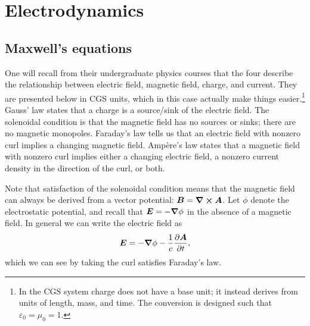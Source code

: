 \section{Electrodynamics}
\subsection{Maxwell's equations}
One will recall from their undergraduate physics courses that the four  describe the relationship between electric field, magnetic field, charge, and current. They are presented below in CGS units, which in this case actually make things easier.\footnote{In the CGS system charge does not have a base unit; it instead derives from units of length, mass, and time. The conversion is designed such that $\varepsilon_0 = \mu_0 = 1$.}
Gauss' law states that a charge is a source/sink of the electric field. The solenoidal condition is that the magnetic field has no sources or sinks; there are no magnetic monopoles. Faraday's law tells us that an electric field with nonzero curl implies a changing magnetic field. Ampère's law states that a magnetic field with nonzero curl implies either a changing electric field, a nonzero current density in the direction of the curl, or both.

Note that satisfaction of the solenoidal condition means that the magnetic field can always be derived from a vector potential: $\vb*{B} = \curl{\vb*{A}}$. Let $\phi$ denote the electrostatic potential, and recall that $\vb*{E} = -\grad{\phi}$ in the absence of a magnetic field. In general we can write the electric field as
\begin{align}
    \vb*{E} = -\grad{\phi} - \frac{1}{c} \pdv{\vb*{A}}{t},
\end{align}
which we can see by taking the curl satisfies Faraday's law.

